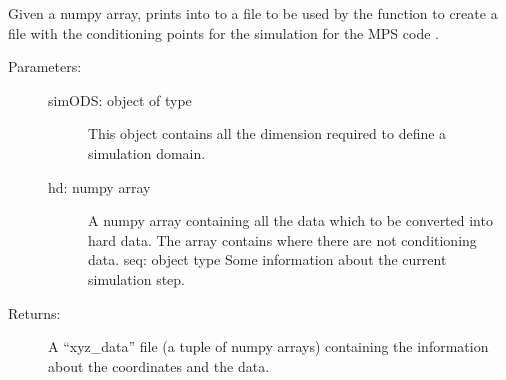 \documentclass[letterpaper,10pt,english]{sphinxmanual}
\begin{document}
\begin{fulllineitems}
\label{\detokenize{appendices:s2Dcd.s2Dcd.numpy2hd4MPDS}}
Given a numpy array, prints into to a  file to be used
by the function  to create a file
with the conditioning points for the simulation for the MPS code
.
\begin{description}
\item[{Parameters:}] \leavevmode\begin{description}
\item[{simODS: object of type }] \leavevmode
This object contains all the dimension required to define a
simulation domain.

\item[{hd: numpy array}] \leavevmode
A numpy array containing all the data which to be
converted into hard data. The array contains
 where there are not conditioning data.
seq: object type {\hyperref[\detokenize{appendices:s2Dcd.s2Dcd.SeqStep}]{}} Some information
about the current simulation step.

\end{description}

\item[{Returns: }] \leavevmode
A “xyz\_data” file (a tuple of numpy arrays) containing the
information about the coordinates and the data.

\end{description}

\end{fulllineitems}

\end{document}
